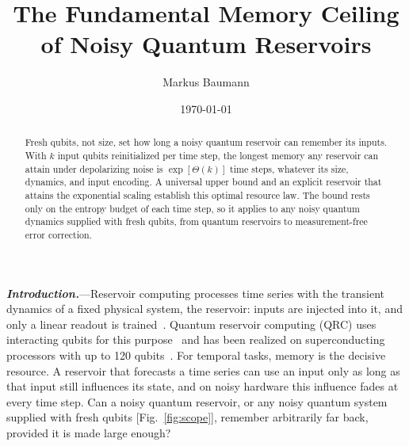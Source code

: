 \documentclass[aps,prl,twocolumn,superscriptaddress,floatfix]{revtex4-2}
\theoremstyle{plain}
\newcommand{\runin}[1]{\textit{\textbf{#1}}---}
\begin{document}
\let\SMaddcontentsline\addcontentsline
\renewcommand{\addcontentsline}[3]{}

\title{The Fundamental Memory Ceiling of Noisy Quantum Reservoirs}

\author{Markus Baumann}

\date{\today}

\begin{abstract}
Fresh qubits, not size, set how long a noisy quantum reservoir can remember its inputs. With $k$ input qubits reinitialized per time step, the longest memory any reservoir can attain under depolarizing noise is $\exp[\Theta(k)]$ time steps, whatever its size, dynamics, and input encoding. A universal upper bound and an explicit reservoir that attains the exponential scaling establish this optimal resource law. The bound rests only on the entropy budget of each time step, so it applies to any noisy quantum dynamics supplied with fresh qubits, from quantum reservoirs to measurement-free error correction.
\end{abstract}

\maketitle


\runin{Introduction.}Reservoir computing processes time series with the transient dynamics of a fixed physical system, the reservoir: inputs are injected into it, and only a linear readout is trained~\cite{Jaeger2001,Maass2002,JaegerHaas2004,Lukosevicius2009,Tanaka2019}. Quantum reservoir computing (QRC) uses interacting qubits for this purpose~\cite{Fujii2017,Nakajima2019,Mujal2021} and has been realized on superconducting processors with up to 120 qubits~\cite{Chen2020,Suzuki2022,Yasuda2023,Hu2024,Monzani2024}. For temporal tasks, memory is the decisive resource. A reservoir that forecasts a time series can use an input only as long as that input still influences its state, and on noisy hardware this influence fades at every time step. Can a noisy quantum reservoir, or any noisy quantum system supplied with fresh qubits [Fig.~\ref{fig:scope}], remember arbitrarily far back, provided it is made large enough?
\end{document}
